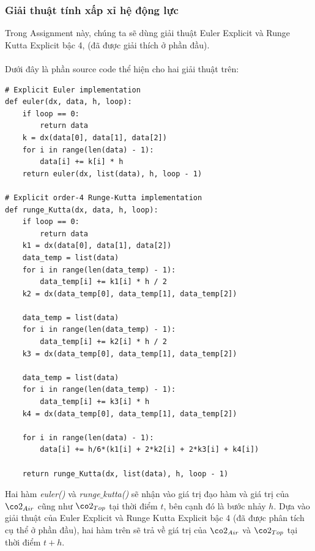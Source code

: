 \documentclass[13pt,a4paper]{article}
\begin{document}
			\subsubsection{Giải thuật tính xấp xỉ hệ động lực}
				Trong Assignment này, chúng ta sẽ dùng giải thuật Euler Explicit và Runge Kutta Explicit bậc 4, (đã được giải thích ở phần đầu). \\ \\
				Dưới đây là phần source code thể hiện cho hai giải thuật trên:
\begin{lstlisting}
# Explicit Euler implementation
def euler(dx, data, h, loop):
	if loop == 0: 
		return data
	k = dx(data[0], data[1], data[2])
	for i in range(len(data) - 1):
		data[i] += k[i] * h
	return euler(dx, list(data), h, loop - 1)

# Explicit order-4 Runge-Kutta implementation
def runge_Kutta(dx, data, h, loop):
	if loop == 0: 
		return data
	k1 = dx(data[0], data[1], data[2])
	data_temp = list(data)
	for i in range(len(data_temp) - 1):
		data_temp[i] += k1[i] * h / 2
	k2 = dx(data_temp[0], data_temp[1], data_temp[2])
	
	data_temp = list(data)
	for i in range(len(data_temp) - 1):
		data_temp[i] += k2[i] * h / 2
	k3 = dx(data_temp[0], data_temp[1], data_temp[2])
	
	data_temp = list(data)
	for i in range(len(data_temp) - 1):
		data_temp[i] += k3[i] * h
	k4 = dx(data_temp[0], data_temp[1], data_temp[2])
	
	for i in range(len(data) - 1):
		data[i] += h/6*(k1[i] + 2*k2[i] + 2*k3[i] + k4[i])
	
	return runge_Kutta(dx, list(data), h, loop - 1)
\end{lstlisting}
				Hai hàm \textit{euler()} và \textit{runge$\_$kutta()} sẽ nhận vào giá trị đạo hàm và giá trị của $\co2_{Air}$ cũng như $\co2_{Top}$ tại thời điểm $t$, bên cạnh đó là bước nhảy $h$. Dựa vào giải thuật của Euler Explicit và Runge Kutta Explicit bậc 4 (đã được phân tích cụ thể ở phần đầu), hai hàm trên sẽ trả về giá trị của $\co2_{Air}$ và $\co2_{Top}$ tại thời điểm $t+h$.
\end{document}
